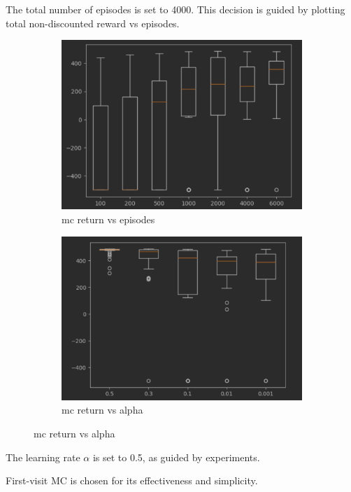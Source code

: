 \documentclass{article}
\begin{document}
    The total number of episodes is set to 4000.
    This decision is guided by plotting total non-discounted reward vs episodes.
    \begin{figure}[h]
        \begin{subfigure} {0.5\textwidth}
            \includegraphics[width=0.9\linewidth]{images/n_episode_vs_reward_mc}
            \caption{mc return vs episodes}\label{fig:mc_return_vs_epi}
        \end{subfigure}
        \begin{subfigure} {0.5\textwidth}
            \includegraphics[width=0.9\linewidth]{images/alpha_vs_reward_mc}
            \caption{mc return vs alpha}\label{fig:mc_return_vs_alpha}
        \end{subfigure}
    \end{figure}

    The learning rate $\alpha$ is set to 0.5, as guided by experiments.

    First-visit MC is chosen for its effectiveness and simplicity.
\end{document}
